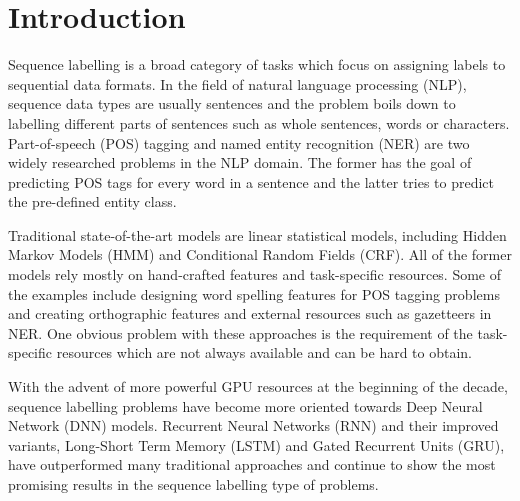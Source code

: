 \section{Introduction}
Sequence labelling is a broad category of tasks which focus on assigning labels
to sequential data formats. In the field of natural language processing (NLP),
sequence data types are usually sentences and the problem boils down to
labelling different parts of sentences such as whole sentences, words or
characters. Part-of-speech (POS) tagging and named entity recognition (NER)
are two widely researched problems in the NLP domain. The former has the goal
of predicting POS tags for every word in a sentence and the latter tries to
predict the pre-defined entity class.

Traditional state-of-the-art models are linear statistical models, including
Hidden Markov Models (HMM)\cite{baum1966statistical} and Conditional Random Fields
(CRF)\cite{lafferty2001conditional}. All of the former models rely mostly on hand-crafted features
and task-specific resources. Some of the examples include designing word
spelling features for POS tagging problems and creating orthographic features
and external resources such as gazetteers in NER. One obvious problem with
these approaches is the requirement of the task-specific resources which are not
always available and can be hard to obtain.

With the advent of more powerful GPU resources at the beginning of the decade,
sequence labelling problems have become more oriented towards Deep Neural
Network (DNN) models. Recurrent Neural Networks (RNN)\cite{goller1996learning} and their
improved variants, Long-Short Term Memory (LSTM)\cite{hochreiter1997long} and Gated Recurrent
Units (GRU)\cite{cho2014properties}, have outperformed many traditional approaches and
continue to show the most promising results in the sequence labelling type of
problems.


